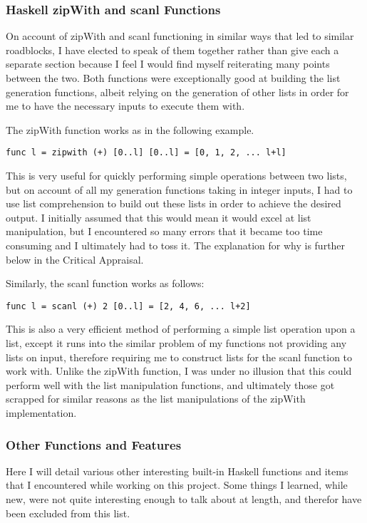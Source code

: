 \documentclass{article}
\theoremstyle{theorem}
\theoremstyle{definition}
\theoremstyle{remark}
\begin{document}
\subsubsection{Haskell zipWith and scanl Functions}
On account of zipWith and scanl functioning in similar ways that led to similar roadblocks, I have elected to speak of them together rather than give each a separate section because I feel I would find myself reiterating many points between the two. Both functions were exceptionally good at building the list generation functions, albeit relying on the generation of other lists in order for me to have the necessary inputs to execute them with.

\medskip\noindent
The zipWith function works as in the following example.

\begin{lstlisting}
func l = zipwith (+) [0..l] [0..l] = [0, 1, 2, ... l+l]
\end{lstlisting}
%
This is very useful for quickly performing simple operations between two lists, but on account of all my generation functions taking in integer inputs, I had to use list comprehension to build out these lists in order to achieve the desired output. I initially assumed that this would mean it would excel at list manipulation, but I encountered so many errors that it became too time consuming and I ultimately had to toss it. The explanation for why is further below in the Critical Appraisal.

\medskip\noindent
Similarly, the scanl function works as follows:

\begin{lstlisting}
func l = scanl (+) 2 [0..l] = [2, 4, 6, ... l+2]
\end{lstlisting}
%
This is also a very efficient method of performing a simple list operation upon a list, except it runs into the similar problem of my functions not providing any lists on input, therefore requiring me to construct lists for the scanl function to work with. Unlike the zipWith function, I was under no illusion that this could perform well with the list manipulation functions, and ultimately those got scrapped for similar reasons as the list manipulations of the zipWith implementation.

\subsubsection{Other Functions and Features}
Here I will detail various other interesting built-in Haskell functions and items that I encountered while working on this project. Some things I learned, while new, were not quite interesting enough to talk about at length, and therefor have been excluded from this list.
\end{document}
